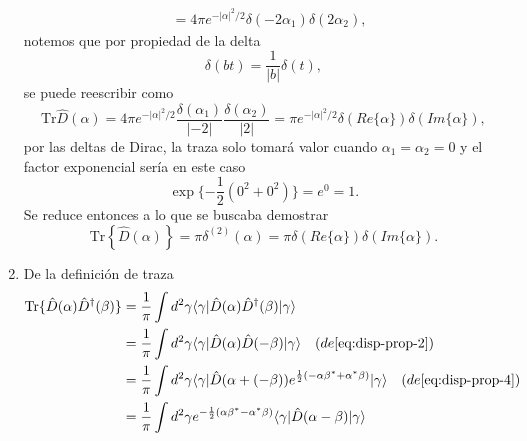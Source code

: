 \begin{enumerate}
\begin{align}
                                         & = 4\pi e^{-|\alpha|^2/2} \delta(-2\alpha_1)\delta(2\alpha_2),
        \end{align}
        notemos que por propiedad de la delta
        \begin{equation}
          \delta(bt) = \frac{1}{|b|}\delta(t),
        \end{equation}
        se puede reescribir como
        \begin{equation}
          \mathrm{Tr}{\hat{D}(\alpha)} = 4\pi e^{-|\alpha|^2/2} \frac{\delta(\alpha_1)}{|-2|}\frac{\delta(\alpha_2)}{|2|} = \pi e^{-|\alpha|^2/2}\delta(Re\{\alpha\})\delta(Im\{\alpha\}),
        \end{equation}
        por las deltas de Dirac, la traza solo tomará valor cuando $\alpha_1 = \alpha_2 = 0$ y el factor exponencial sería en este caso
        \begin{equation}
          \exp\{ -\frac{1}{2}(0^2 + 0^2) \} = e^0 = 1.
        \end{equation}
        Se reduce entonces a lo que se buscaba demostrar
        \begin{equation}
          \mathrm{Tr}\left\{\hat{D}(\alpha)\right\} = \pi \delta^{(2)}(\alpha) = \pi\delta(Re\{\alpha\})\delta(Im\{\alpha\}).
        \end{equation}
  \item De la definición de traza
        \begin{align}
          \mathrm{Tr}\{ \hat{D}(\alpha)\hat{D}^{\dagger}(\beta) \} & = \frac{1}{\pi} \int d^2 \gamma \langle  \gamma \vert \hat{D}(\alpha) \hat{D}^{\dagger}(\beta) \vert \gamma \rangle \nonumber                                                                                                      \\
                                                                   & = \frac{1}{\pi} \int d^2 \gamma \langle \gamma \vert \hat{D}(\alpha) \hat{D}(-\beta) \vert \gamma\rangle \quad (de \ref{eq:disp-prop-2})\nonumber                                                                                  \\
                                                                   & = \frac{1}{\pi} \int d^2 \gamma \langle \gamma \vert \hat{D}(\alpha + (-\beta))e^{\frac{1}{2}(-\alpha \beta^{*} + \alpha^{*} \beta)} \vert \gamma \rangle \quad (de \ref{eq:disp-prop-4})\nonumber                                 \\
                                                                   & = \frac{1}{\pi} \int d^2 \gamma e^{-\frac{1}{2}(\alpha \beta^* - \alpha^* \beta)} \langle \gamma \vert \hat{D}(\alpha-\beta)\vert \gamma\rangle  \nonumber                                                                         \\

\end{align}
\end{enumerate}

